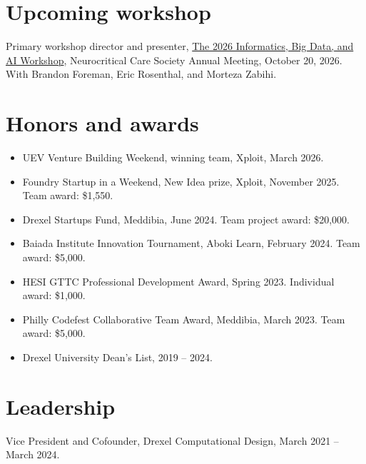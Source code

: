 \documentclass[11pt,letterpaper]{article}
\begin{document}
\section{Upcoming workshop}
Primary workshop director and presenter, \href{https://ncs2026.conference-program.com/presentation/?id=WSHP116&sess=sess125}{The 2026 Informatics, Big Data, and AI Workshop}, Neurocritical Care Society Annual Meeting, October 20, 2026. With Brandon Foreman, Eric Rosenthal, and Morteza Zabihi.

\section{Honors and awards}
\begin{itemize}[itemsep=2pt]
\item UEV Venture Building Weekend, winning team, Xploit, March 2026.
\item Foundry Startup in a Weekend, New Idea prize, Xploit, November 2025. Team award: \$1,550.
\item Drexel Startups Fund, Meddibia, June 2024. Team project award: \$20,000.
\item Baiada Institute Innovation Tournament, Aboki Learn, February 2024. Team award: \$5,000.
\item HESI GTTC Professional Development Award, Spring 2023. Individual award: \$1,000.
\item Philly Codefest Collaborative Team Award, Meddibia, March 2023. Team award: \$5,000.
\item Drexel University Dean's List, 2019 -- 2024.
\end{itemize}

\section{Leadership}
Vice President and Cofounder, Drexel Computational Design, March 2021 -- March 2024.
\end{document}
